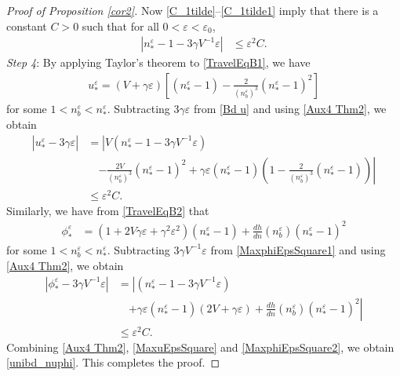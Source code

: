 \documentclass{amsart}
\newcommand{\veps}{\varepsilon}
\numberwithin{equation}{section}
\theoremstyle{plain}%
\theoremstyle{definition}
\theoremstyle{remark}
\theoremstyle{remark}
\begin{document}
\begin{proof}[Proof of Proposition \ref{cor2}]
Now \eqref{C_1tilde}--\eqref{C_1tilde1} imply that there is a constant $C>0$ such that for all $0<\veps<\veps_0$,
\begin{equation}\label{Aux4 Thm2}
\begin{split}
\left| n_\ast^\veps-1- 3\gamma V^{-1}\veps \right|
& \leq  \veps^2 C.
\end{split}
\end{equation}
\textit{Step 4}: 
By applying Taylor's theorem to \eqref{TravelEqB1}, we have 
\begin{equation}\label{Bd u}
\begin{split}
u_\ast^\veps  = (V+\gamma\veps)\left[(n_\ast^\veps-1) -\frac{2}{(n_b^\veps)^3}(n_\ast^\veps-1)^2  \right]
\end{split}
\end{equation}
for some $1<n_b^\veps<n_\ast^\veps$. Subtracting $3\gamma\veps$ from \eqref{Bd u} and using \eqref{Aux4 Thm2}, we obtain
\begin{equation}\label{MaxuEpsSquare}
\begin{split}
\left| u_\ast^\veps-3\gamma\veps \right|
& =  \left|  V\left(n_\ast^\veps-1-3\gamma V^{-1}\veps\right) \right.\\
& \quad \left.
-\frac{2V}{(n_b^\veps)^3} (n_\ast^\veps-1)^2  + \gamma\veps(n_\ast^\veps-1) \left(1 -\frac{2}{(n_b^\veps)^3}(n_\ast^\veps-1)  \right)  \right|\\
& \leq \veps^2C.
\end{split}
\end{equation}
Similarly, we have from \eqref{TravelEqB2} that 
\begin{equation}\label{MaxphiEpsSquare1}
\begin{split}
\phi_\ast^\veps
& = (1+2V\gamma\veps + \gamma^2\veps^2)(n_\ast^\veps-1) + \frac{dh}{dn}(n_b^\veps) (n_\ast^\veps-1)^2
\end{split}
\end{equation}
for some $1<n_b^\veps<n_\ast^\veps$. Subtracting $3\gamma V^{-1}\veps$ from \eqref{MaxphiEpsSquare1} and using \eqref{Aux4 Thm2}, we obtain
\begin{equation}\label{MaxphiEpsSquare2}
\begin{split}
\left| \phi_\ast^\veps - 3\gamma V^{-1}\veps \right|
& = \left| \left(n_\ast^\veps-1 -3\gamma V^{-1}\veps \right) \right. \\
& \quad \left. + \gamma\veps(n_\ast^\veps-1)(2V + \gamma\veps) +\frac{dh}{dn}(n_b^\veps) (n_\ast^\veps-1)^2 \right|\\
& \leq \veps^2C.
\end{split}
\end{equation}
Combining \eqref{Aux4 Thm2}, \eqref{MaxuEpsSquare} and \eqref{MaxphiEpsSquare2}, we obtain \eqref{unibd_nuphi}. This completes the proof.
\end{proof}
\end{document}
